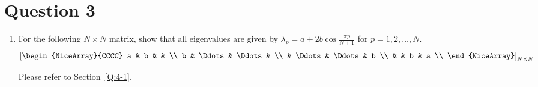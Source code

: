 \section{Question 3}
\begin{enumerate}[label=(\alph*)]
    \item For the following $N\times N$ matrix, show that all eigenvalues are given by $\lambda_p = a+2b\cos\tfrac{\pi p}{N+1}$ for $p=1,2,\ldots,N$.
        \[
            \qty[\begin{NiceArray}{CCCC}
                a & b      &        &   \\
                b & \Ddots & \Ddots &   \\
                  & \Ddots & \Ddots & b \\
                  &        & b      & a \\
            \end{NiceArray}]_{N\times N}
        \]
        \begin{solution}{}{}
            Please refer to Section~\ref{Q:4-1}.
        \end{solution}
\end{enumerate}



